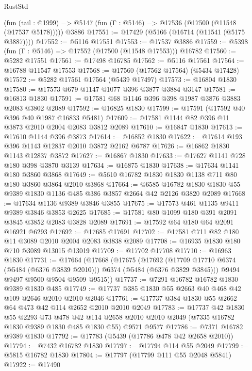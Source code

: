 \begin{lexlean}{RustStd}
\begin{coremodule}
{\begin{coremodule}
{{{{{{{{{{{{{{{{{{{{{{{{{{{{{{{    (fun (tail : @1999) => @5147 (fun (Γ : @5146) => @17536 (@17500 (@11548 (@17537 @5178)))))
    @3886
@17551 := @17429 (@5166 (@16714 (@11541 (@5175 @3887))))
@17552 := @5116 @17551
@17553 := @17537 @3886
@17559 := @5398 (fun (Γ : @5146) => @17552 (@17500 (@11548 @17553))) @16782
@17560 := @5282 @17551
@17561 := @17498 @16785
@17562 := @5116 @17561
@17564 := @16788 @11547 @17553
@17568 := @17560 (@17562 @17564) (@5434 @17428)
@17572 := @5282 @17561 @17564 (@5439 @17497)
@17573 := @16804 @1830
@17580 := @17573 @679 @1147 @1077 @396 @3877 @3884 @3147
@17581 := @16813 @1830
@17591 := @17581 @68 @1146 @396 @398 @1987 @3876 @3883 @2083 @3802 @2089
@17592 := @16825 @1830
@17599 := @17591 (@17592 @40 @396 @40 @1987 @16833 @5481)
@17609 := @17581 @1144 @82 @396 @11 @3873 @2010 @2004 @2083 @3812 @2089
@17610 := @16847 @1830
@17613 := @17610 @1144 @396 @3873
@17614 := @16852 @1830
@17622 := @17614 @193 @396 @1143 @12837 @2010 @3872 @2162 @6787
@17626 := @16862 @1830 @1143 @12837 @3872
@17627 := @16867 @1830
@17633 := @17627 @1141 @728 @180 @398 @3870 @3139
@17634 := @16875 @1830
@17638 := @17634 @1141 @180 @3860 @3868
@17649 := @5610 @16782 @1830 @1830 @1138 @711 @80 @180 @3860 @3864 @2010 @3868
@17664 := @6585 @16782 @1830 @1830 @55 @9389 @1830 @1136 @485 @386 @3857 @2664 @42 @2126 @3820 @2089
@17668 := @17634 @1136 @9389 @3846 @3855
@17675 := @17573 @461 @1135 @9411 @9389 @3846 @3853 @2625
@17685 := @17581 @80 @1099 @180 @391 @2091 @3845 @3852 @2083 @3828 @2089
@17691 := @17592 @64 @180 @64 @2091 @16921 @6293
@17692 := @17685 @17691
@17702 := @17581 @711 @82 @180 @11 @3089 @2010 @2004 @2083 @3838 @2089
@17708 := @16935 @1830 @180 @710 @3089 @13015 @13019
@17709 := @17702 @17708
@17710 := @16963 @1830
@17731 := @17664
    (@17668
      (@17675
        (@17692 (@17709 @17710 @6374 (@5484 (@6376 @3839 @2010))) @6374 (@5484 (@6376 @3829 @3845)))
        @9494
        @9497
        @9500
        @9504
        @9509
        @9515))
@17737 := @7291 @16782 @16782 @1830 @9389 @1830 @485
@17749 := @17737 @385 @1830 @55 @2663 @40 @468 @42 @109 @2646 @2010 @2010 @2046
@17761 := @17737 @384 @1830 @55 @2662 @64 @473 @42 @114 @2652 @2010 @2010 @2049
@17783 := @17737
    @42
    @1830
    @55
    @2293
    @73
    @478
    @42
    @114
    @2658
    @2010
    @2010
    @2049
    (@7335 @16782 @1830 @9389 @1830 @485 @1830 @55)
    @9571
    @9577
@17786 := @7371 @16782 @9389 @1830
@17792 := @17783 (@5439 (@17786 @478 @42 @2658 @2010))
@17794 := @7432 @16782 @1830
@17797 := @17794 @114 @55 @2049
@17799 := @5815 @16782 @1830
@17804 := @17797 (@17799 @111 @55 @2048 @5841)
@17922 := @17490
}}}}}}}}}}}}}}}}}}}}}}}}}}}}}}}
\end{coremodule}}
\end{coremodule}
\end{lexlean}
